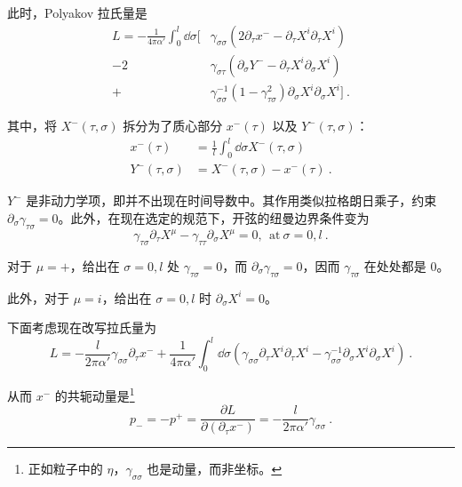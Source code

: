 此时，Polyakov 拉氏量是 
\begin{equation}
	\begin{aligned}
		L = -\frac{1}{4 \pi \alpha'} \int_0^l \dd \sigma [&\gamma_{\sigma \sigma}(2 \partial_\tau x^- - \partial_\tau X^i \partial_\tau X^i)\\
		-2 & \gamma_{\sigma \tau}(\partial_\sigma Y^- - \partial_\tau X^i \partial_\sigma X^i) \\
		+&\gamma_{\sigma \sigma}^{-1}(1-\gamma_{\tau \sigma}^2) \partial_\sigma X^i \partial_\sigma X^i] ~.
	\end{aligned}
\end{equation}

其中，将 $X^-(\tau, \sigma)$ 拆分为了质心部分 $x^-(\tau)$ 以及 $Y^-(\tau, \sigma)$：
\begin{equation}
	\begin{aligned}
		x^-(\tau) &= \frac{1}{l} \int_0^l \dd \sigma X^-(\tau, \sigma) \\
		Y^-(\tau, \sigma) &= X^-(\tau, \sigma) - x^-(\tau) ~.
	\end{aligned}
\end{equation}

$Y^-$ 是非动力学项，即并不出现在时间导数中。其作用类似拉格朗日乘子，约束 $\partial_\sigma \gamma_{\tau \sigma} = 0$。此外，在现在选定的规范下，开弦的纽曼边界条件变为
\begin{equation}
	\gamma_{\tau \sigma} \partial_\tau X^\mu - \gamma_{\tau \tau} \partial_\sigma X^\mu = 0, ~~ \text{at} ~ \sigma = 0, l ~.
\end{equation}

对于 $\mu = +$，给出在 $\sigma = 0, l$ 处 $\gamma_{\tau \sigma} = 0$，而 $\partial_{\sigma} \gamma_{\tau \sigma} = 0$，因而 $\gamma_{\tau \sigma}$ 在处处都是 $0$。

此外，对于 $\mu = i$，给出在 $\sigma = 0, l$ 时 $\partial_\sigma X^i = 0$。


下面考虑现在改写拉氏量为 
\begin{equation}
	L = -\frac{l}{2\pi \alpha'} \gamma_{\sigma \sigma} \partial_\tau x^- + \frac{1}{4\pi\alpha'} \int_0^l \dd \sigma (\gamma_{\sigma \sigma} \partial_\tau X^i \partial_\tau X^i - \gamma_{\sigma \sigma}^{-1} \partial_\sigma X^i \partial_{\sigma} X^i) ~.
\end{equation}

从而 $x^-$ 的共轭动量是\footnote{正如粒子中的 $\eta$，$\gamma_{\sigma \sigma}$ 也是动量，而非坐标。}
\begin{equation}
	p_- = -p^+ = \frac{\partial L}{\partial(\partial_\tau x^-)} = -\frac{l}{2\pi \alpha'} \gamma_{\sigma \sigma } ~.
\end{equation}

